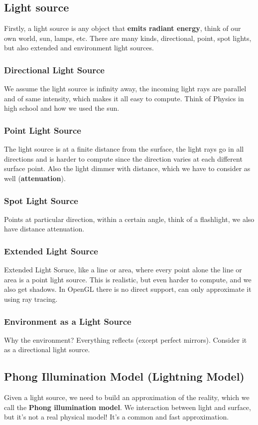 \documentclass[11pt]{article}
\begin{document}
\subsection{Light source}
Firstly, a light source is any object that \textbf{emits radiant energy}, think of our own world, sun, lamps, etc. There are many kinds, directional, point, spot lights, but also extended and environment light sources.

\subsubsection*{Directional Light Source}
We assume the light source is infinity away, the incoming light rays are parallel and of same intensity, which makes it all easy to compute. Think of Physics in high school and how we used the sun. 
\subsubsection*{Point Light Source}
The light source is at a finite distance from the surface, the light rays go in all directions and is harder to compute since the direction varies at each different surface point. Also the light dimmer with distance, which we have to consider as well (\textbf{attenuation}).

\subsubsection*{Spot Light Source}
Points at particular direction, within a certain angle, think of a flashlight, we also have distance attenuation. 

\subsubsection*{Extended Light Source}
Extended Light Soruce, like a line or area, where every point alone the line or area is a point light source. This is realistic, but even harder to compute, and we also get shadows. In OpenGL there is no direct support, can only approximate it using ray tracing.

\subsubsection*{Environment as a Light Source}
Why the environment? Everything reflects (except perfect mirrors). Consider it as a directional light source.

\subsection{Phong Illumination Model (Lightning Model)}
Given a light source, we need to build an approximation of the reality, which we call the \textbf{Phong illumination model}. We interaction between light and surface, but it's not a real physical model! It's a common and fast approximation.
\end{document}
